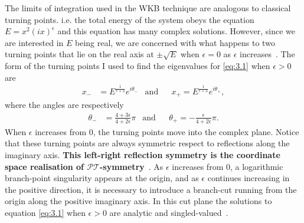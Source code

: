 \documentclass[12pt, a4paper]{report}
\newcommand\PT{\(\mathcal{PT}\)}
\begin{document}
The limits of integration used in the WKB technique are analogous to classical turning points. i.e. the total energy of the system obeys the equation $E = x^2 (ix)^{\epsilon}$ and this equation has many complex solutions. However, since we are interested in $E$ being real, we are concerned with what happens to two turning points that lie on the real axis at $\pm \sqrt{E}$ when $\epsilon = 0$ as $\epsilon$ increases~\cite{PTsymmetricQM, MakingSense}.
The form of the turning points I used to find the eigenvalues for \ref{eq:3.1} when $\epsilon>0$ are
\begin{align}
x_{-}& = 
E^{\frac{1}{\epsilon + 2}}
e^{i\theta_{-}}
&\mathrm{and}&
&x_{+} = E^{\frac{1}{\epsilon + 2}} e^{i\theta_{+}},
\end{align}
where the angles are respectively
\begin{align}
\theta_{-}& = \frac{4 + 3\epsilon}{4 + 2 \epsilon} \pi
&\mathrm{and}&
&\theta_{+} = - \frac{\epsilon}{4 + 2 \epsilon} \pi.
\end{align}
When $\epsilon$ increases from 0, the turning points move into the complex plane. Notice that these turning points are always symmetric respect to reflections along the imaginary axis. \textbf{This left-right reflection symmetry is the coordinate space realisation of \PT-symmetry}~\cite{PTsymmetricQM}.
As $\epsilon$ increases from 0, a logarithmic branch-point singularity appears at the origin, and as $\epsilon$ continues increasing in the positive direction, it is necessary to introduce a branch-cut running from the origin along the positive imaginary axis. In this cut plane the solutions to equation \ref{eq:3.1} when $\epsilon>0$ are analytic and singled-valued~\cite{PTsymmetricQM}.
\end{document}
